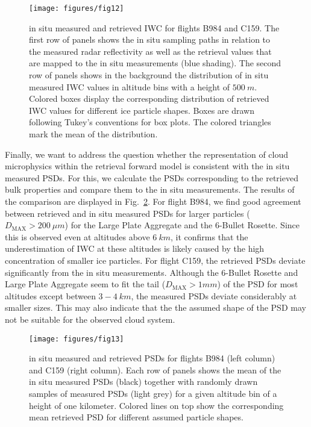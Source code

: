 \documentclass[journal abbreviation, manuscript]{copernicus}
\begin{document}
\begin{figure}[!hbpt]
  \centering
  \texttt{[image: figures/fig12]}
  \caption{in situ measured and retrieved IWC for flights B984 and C159. The
    first row of panels shows the in situ sampling paths in relation to the
    measured radar reflectivity as well as the retrieval values that are mapped
    to the in situ measurements (blue shading). The second row of panels shows
    in the background the distribution of in situ measured IWC values in
    altitude bins with a height of $500\ \unit{m}$. Colored boxes display the
    corresponding distribution of retrieved IWC values for different ice
    particle shapes. Boxes are drawn following Tukey's conventions for box
    plots. The colored triangles mark the mean of the distribution.}
  \label{fig:in_situ_iwc}
\end{figure}

Finally, we want to address the question whether the representation of cloud
microphysics within the retrieval forward model is consistent with the in situ
measured PSDs. For this, we calculate the PSDs corresponding to the retrieved
bulk properties and compare them to the in situ measurements. The results of the
comparison are displayed in Fig.~\ref{fig:in_situ_psds}. For flight B984, we
find good agreement between retrieved and in situ measured PSDs for larger
particles ($D_\text{MAX} > 200 \ \unit{\mu m}$) for the Large Plate Aggregate
and the 6-Bullet Rosette. Since this is observed even at altitudes above $6
\ \unit{km}$, it confirms that the underestimation of IWC at these altitudes is
likely caused by the high concentration of smaller ice particles. For flight
C159, the retrieved PSDs deviate significantly from the in situ measurements.
Although the 6-Bullet Rosette and Large Plate Aggregate seem to fit the tail
($D_\text{MAX} > 1 \unit{mm}$) of the PSD for most altitudes except between $3 -
4\ \unit{km}$, the measured PSDs deviate considerably at smaller sizes. This may
also indicate that the the assumed shape of the PSD may not be suitable for the
observed cloud system.

\begin{figure}[!hbpt]
  \centering
  \texttt{[image: figures/fig13]}
  \caption{in situ measured and retrieved PSDs for flights B984 (left column)
    and C159 (right column). Each row of panels shows the mean of the
    in situ measured PSDs (black) together with randomly drawn samples of
    measured PSDs (light grey) for a given altitude bin of a height of one
    kilometer. Colored lines on top show the corresponding mean retrieved PSD
    for different assumed particle shapes.}
  \label{fig:in_situ_psds}
\end{figure}
\end{document}
